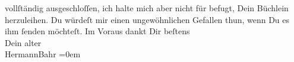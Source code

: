 \begin{ledgroupsized}[t]{13cm}
               vollſtändig ausgeschloſſen, ich halte mich aber nicht für befugt, Dein Büchlein
               herzuleihen. Du würdeſt mir einen ungewöhnlichen Gefallen thun, wenn Du es ihm ſenden
               möchteſt.\pend
           \pstart
           Im Voraus dankt Dir beſtens{\\[\baselineskip]}Dein alter{\\[\baselineskip]}\spacefill\mbox{HermannBahr}\pend
           \leftskip=0em{}
         
         \endnumbering{}\end{ledgroupsized}  \newcommand{\dateiname}{L01037}\newcommand{\titel}{Hermann Bahr an Arthur Schnitzler, [19. 5. 1900]}\newcommand{\editorInnen}{ Kurt Ifkovits,  Martin Anton Müller}
      
